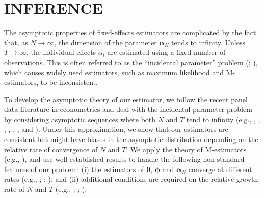 \documentclass[12pt]{article}
\def\thetavec{\bm{\theta}}
\def\phivec{\bm{\phi}}
\def\aa{\bm{\alpha}_N}
\begin{document}







\section{INFERENCE}\label{sec:asy}

The asymptotic properties of fixed-effects estimators are complicated by the fact that,
as $N \to \infty$, the dimension of the parameter $\aa$ 
tends to infinity. Unless $T \to \infty$, 
the individual effects $\alpha_i$ are estimated using a fixed number of observations.
This is often referred to as the ``incidental parameter'' problem 
(\citealp{NS}; \citealp{lancaster}), which causes widely used estimators, such as
maximum likelihood and M-estimators, to be inconsistent. 

To develop the asymptotic theory of our estimator,
we follow the recent panel data literature in econometrics and deal with the incidental parameter problem by considering asymptotic sequences where  both $N$ and $T$ tend to infinity (e.g., \citealp{Phillips:1999p733}, \citealp{hn}, \citealp{koenker2004},  \citealp{fv}, \citealp{ArellanoHahn2007}, \citealp{lamarche}, and \citealp{kato}). Under this  approximation, we show that our estimators are consistent but might have biases in the asymptotic distribution depending on the relative rate of convergence of $N$ and $T$. We apply the theory of M-estimators
(e.g., \citealp{newey}), and use well-established results to handle the following non-standard
features of our problem: (i) the estimators of $\thetavec$, $\phivec$ and $\aa$ converge at
different rates (e.g., \citealp{radchenko}; \citealp{cs}; \citealp{masuda}); and (ii) additional
conditions are required on the relative growth rate of $N$ and $T$ (e.g., 
\citealp{hn}; \citealp{fv}; \citealp{neweynotes}).
\end{document}

